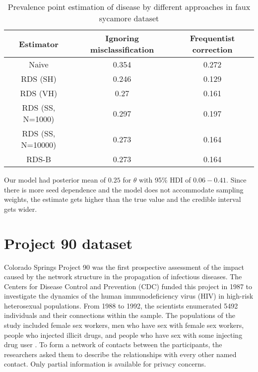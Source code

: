\begin{table}[htbp]
    \centering
    \caption{\label{tab:results-estimators-faux-sycamore-data}Prevalence point estimation of
    disease by different approaches in faux sycamore dataset}
    \begin{tabular}{ccc}
        \hline
        Estimator & Ignoring misclassification & Frequentist correction \\ \hline
        Naive & 0.354 & 0.272 \\
        RDS (SH) & 0.246 & 0.129 \\
        RDS (VH) & 0.27 & 0.161 \\
        RDS (SS, N=1000) & 0.297 & 0.197 \\
        RDS (SS, N=10000) & 0.273 & 0.164 \\
        RDS-B & 0.273 & 0.164 \\ \hline
        \end{tabular}
\end{table}

Our model had posterior mean of $0.25$ for $\theta$ with 95\% HDI of $0.06 -
0.41$. Since there is more seed dependence and the model does not accommodate
sampling weights, the estimate gets higher than the true value and the
credible interval gets wider.

\section{Project 90 dataset}

Colorado Springs Project 90 was the first prospective assessment of the impact
caused by the network structure in the propagation of infectious diseases. The
Centers for Disease Control and Prevention (CDC) funded this project in 1987
to investigate the dynamics of the human immunodeficiency virus (HIV) in
high-risk heterosexual populations. From 1988 to 1992, the scientists
enumerated 5492 individuals and their connections within the sample. The
populations of the study included female sex workers, men who have sex with
female sex workers, people who injected illicit drugs, and people who have sex
with some injecting drug user \cite[p. 1332]{woodhouse1994mapping}. To form a network of contacts between the
participants, the researchers asked them to describe the relationships with
every other named contact. Only partial information is available for privacy
concerns. 

